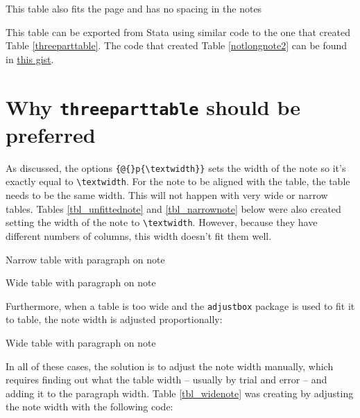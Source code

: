 \documentclass[11pt,a4paper]{article}
\begin{document}
\begin{table}[H]
	\caption{This table also fits the page and has no spacing in the notes}
	\label{notlongnote2}
		
\end{table}

This table can be exported from Stata using similar code to the one that created Table \ref{threeparttable}. The code that created Table \ref{notlongnote2} can be found in \href{https://gist.github.com/luizaandrade/568f18158b9f154f531da55d98653c77}{this gist}.

\section{Why \texttt{threeparttable} should be preferred}

As discussed, the options \texttt{\{@\{\}p\{\textbackslash textwidth\}\}} sets the width of the note so it's exactly equal to \texttt{\textbackslash textwidth}. For the note to be aligned with the table, the table needs to be the same width. This will not happen with very wide or narrow tables. Tables \ref{tbl_unfittednote} and \ref{tbl_narrownote} below were also created setting the width of the note to \texttt{\textbackslash textwidth}. However, because they have different numbers of columns, this width doesn't fit them well.

\begin{table}[H]
	\caption{Narrow table with paragraph on note}
	\label{tbl_unfittednote}
	
\end{table}

\begin{table}[H]
	\caption{Wide table with paragraph on note}
	\label{tbl_narrownote}
	
\end{table}

Furthermore, when a table is too wide and the \texttt{adjustbox} package is used to fit it to table, the note width is adjusted proportionally:

\begin{table}[H]
	\caption{Wide table with paragraph on note}
	\label{tbl_narrownoteadj}
	\begin{adjustbox}{max width = \textwidth}
		
	\end{adjustbox}
\end{table}

In all of these cases, the solution is to adjust the note width manually, which requires finding out what the table width -- usually by trial and error -- and adding it to the paragraph width. Table \ref{tbl_widenote} was creating by adjusting the note width with the following code:
\end{document}
